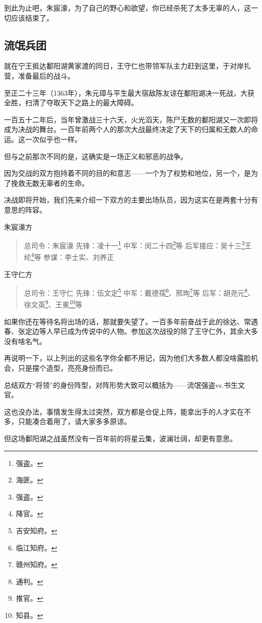 \begin{multicols}{\theparacolNo}
		到此为止吧，朱宸濠，为了自己的野心和欲望，你已经杀死了太多无辜的人，这一切应该结束了。

		\subsection{流氓兵团}
		就在宁王抵达鄱阳湖黄家渡的同日，王守仁也带领军队主力赶到这里，于对岸扎营，准备最后的战斗。

		至正二十三年（1363年），朱元璋与平生最大宿敌陈友谅在鄱阳湖决一死战，大获全胜，扫清了夺取天下之路上的最大障碍。

		一百五十二年后，当年曾激战三十六天，火光滔天，陈尸无数的鄱阳湖又一次即将成为决战的舞台。一百年前两个人的那次大战最终决定了天下的归属和无数人的命运。这一次似乎也一样。

		但与之前那次不同的是，这确实是一场正义和邪恶的战争。

		因为交战的双方抱持着不同的目的和意志——一个为了权势和地位，另一个，是为了挽救无数无辜者的生命。

		决战即将开始，我们先来介绍一下双方的主要出场队员，因为这实在是两套十分有意思的阵容。

		朱宸濠方
		{\footnotesize \begin{quote}
			总司令：朱宸濠
			先锋：凌十一\footnote{强盗。}
			中军：闵二十四\footnote{海匪。}等
			后军接应：吴十三\footnote{强盗。}王纶\footnote{降官。}等
			参谋：李士实、刘养正
		\end{quote}}

		王守仁方
		{\footnotesize \begin{quote}
			总司令：王守仁
			先锋：伍文定\footnote{吉安知府。}
			中军：戴德孺\footnote{临江知府。}、邢珣\footnote{赣州知府。}等
			后军：胡尧元\footnote{通判。}、徐文英\footnote{推官。}、王冕\footnote{知县。}等
		\end{quote}}

		如果你还在等待名将出场的话，那就要失望了。一百多年前奋战于此的徐达、常遇春、张定边等人早已成为传说中的人物。参加这次战役的除了王守仁外，其余大多没有啥名气。

		再说明一下，以上列出的这些名字你全都不用记，因为他们大多数人都没啥露脸机会，只是摆个造型，亮亮身份而已。

		总结双方“将领”的身份阵型，对阵形势大致可以概括为——流氓强盗vs.书生文官。

		这也没办法，事情发生得太过突然，双方都是仓促上阵，能拿出手的人才实在不多，只能凑合着用了，请大家多多原谅。

		但这场鄱阳湖之战虽然没有一百年前的将星云集，波澜壮阔，却更有意思。


\end{multicols}
